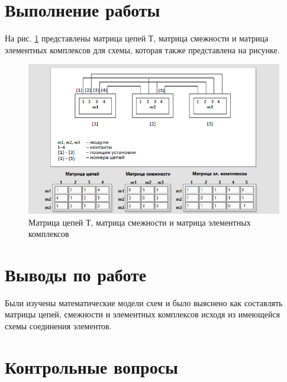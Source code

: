\documentclass[a4paper,14pt]{article}
\begin{document}
\section{Выполнение работы}
	
	На рис. \ref{fig:lab7} представлены матрица цепей Т, матрица смежности и матрица элементных комплексов для схемы, которая также представлена на рисунке.
	
\begin{figure}[H]
	\centering
	\includegraphics[width=0.7\linewidth]{image/lab_7}
	\caption{Матрица цепей Т, матрица смежности и матрица элементных комплексов}
	\label{fig:lab7}
\end{figure}


\section{Выводы по работе}

Были изучены математические модели схем и было выяснено как составлять матрицы цепей, смежности и элементных комплексов исходя из имеющейся схемы соединения элементов.

\section{Контрольные вопросы}
\end{document}
